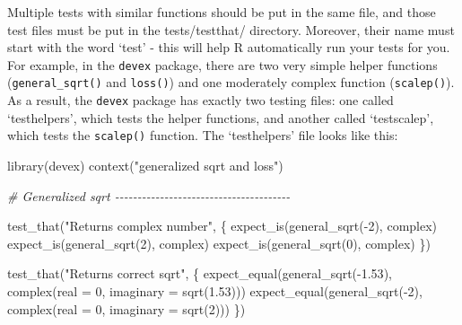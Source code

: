 \documentclass[
]{book}
\newenvironment{Shaded}{\begin{snugshade}}{\end{snugshade}}
\newcommand{\AttributeTok}[1]{\textcolor[rgb]{0.77,0.63,0.00}{#1}}
\newcommand{\CommentTok}[1]{\textcolor[rgb]{0.56,0.35,0.01}{\textit{#1}}}
\newcommand{\DecValTok}[1]{\textcolor[rgb]{0.00,0.00,0.81}{#1}}
\newcommand{\FloatTok}[1]{\textcolor[rgb]{0.00,0.00,0.81}{#1}}
\newcommand{\FunctionTok}[1]{\textcolor[rgb]{0.00,0.00,0.00}{#1}}
\newcommand{\NormalTok}[1]{#1}
\newcommand{\SpecialCharTok}[1]{\textcolor[rgb]{0.00,0.00,0.00}{#1}}
\newcommand{\StringTok}[1]{\textcolor[rgb]{0.31,0.60,0.02}{#1}}
\begin{document}
Multiple tests with similar functions should be put in the same file, and those test files must be put in the tests/testthat/ directory. Moreover, their name must start with the word `test' - this will help R automatically run your tests for you. For example, in the \texttt{devex} package, there are two very simple helper functions (\texttt{general\_sqrt()} and \texttt{loss()}) and one moderately complex function (\texttt{scalep()}). As a result, the \texttt{devex} package has exactly two testing files: one called `testhelpers', which tests the helper functions, and another called `testscalep', which tests the \texttt{scalep()} function. The `testhelpers' file looks like this:

\begin{Shaded}
\begin{Highlighting}[]
\FunctionTok{library}\NormalTok{(devex)}
\FunctionTok{context}\NormalTok{(}\StringTok{"generalized sqrt and loss"}\NormalTok{)}

\CommentTok{\# Generalized sqrt {-}{-}{-}{-}{-}{-}{-}{-}{-}{-}{-}{-}{-}{-}{-}{-}{-}{-}{-}{-}{-}{-}{-}{-}{-}{-}{-}{-}{-}{-}{-}{-}{-}{-}{-}{-}{-}{-}{-}}

\FunctionTok{test\_that}\NormalTok{(}\StringTok{"Returns complex number"}\NormalTok{, \{}
  \FunctionTok{expect\_is}\NormalTok{(}\FunctionTok{general\_sqrt}\NormalTok{(}\SpecialCharTok{{-}}\DecValTok{2}\NormalTok{), }\StringTok{\textquotesingle{}complex\textquotesingle{}}\NormalTok{)}
  \FunctionTok{expect\_is}\NormalTok{(}\FunctionTok{general\_sqrt}\NormalTok{(}\DecValTok{2}\NormalTok{), }\StringTok{\textquotesingle{}complex\textquotesingle{}}\NormalTok{)}
  \FunctionTok{expect\_is}\NormalTok{(}\FunctionTok{general\_sqrt}\NormalTok{(}\DecValTok{0}\NormalTok{), }\StringTok{\textquotesingle{}complex\textquotesingle{}}\NormalTok{)}
\NormalTok{\})}

\FunctionTok{test\_that}\NormalTok{(}\StringTok{"Returns correct sqrt"}\NormalTok{, \{}
  \FunctionTok{expect\_equal}\NormalTok{(}\FunctionTok{general\_sqrt}\NormalTok{(}\SpecialCharTok{{-}}\FloatTok{1.53}\NormalTok{), }\FunctionTok{complex}\NormalTok{(}\AttributeTok{real =} \DecValTok{0}\NormalTok{, }\AttributeTok{imaginary =} \FunctionTok{sqrt}\NormalTok{(}\FloatTok{1.53}\NormalTok{)))}
  \FunctionTok{expect\_equal}\NormalTok{(}\FunctionTok{general\_sqrt}\NormalTok{(}\SpecialCharTok{{-}}\DecValTok{2}\NormalTok{), }\FunctionTok{complex}\NormalTok{(}\AttributeTok{real =} \DecValTok{0}\NormalTok{, }\AttributeTok{imaginary =} \FunctionTok{sqrt}\NormalTok{(}\DecValTok{2}\NormalTok{)))}
\NormalTok{\})}


\end{Highlighting}
\end{Shaded}
\end{document}
